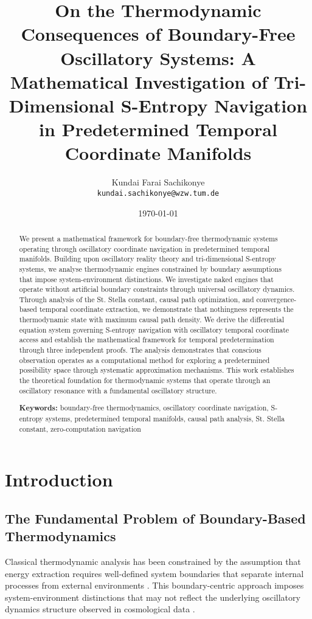 \documentclass[11pt,a4paper]{article}
\title{On the Thermodynamic Consequences of Boundary-Free Oscillatory Systems: A Mathematical Investigation of Tri-Dimensional S-Entropy Navigation in Predetermined Temporal Coordinate Manifolds}
\author{
Kundai Farai Sachikonye\\
\texttt{kundai.sachikonye@wzw.tum.de}
}
\date{\today}
\theoremstyle{remark}
\begin{document}
\maketitle

\begin{abstract}
We present a mathematical framework for boundary-free thermodynamic systems operating through oscillatory coordinate navigation in predetermined temporal manifolds. Building upon oscillatory reality theory and tri-dimensional S-entropy systems, we analyse thermodynamic engines constrained by boundary assumptions that impose system-environment distinctions. We investigate naked engines that operate without artificial boundary constraints through universal oscillatory dynamics. Through analysis of the St. Stella constant, causal path optimization, and convergence-based temporal coordinate extraction, we demonstrate that nothingness represents the thermodynamic state with maximum causal path density. We derive the differential equation system governing S-entropy navigation with oscillatory temporal coordinate access and establish the mathematical framework for temporal predetermination through three independent proofs. The analysis demonstrates that conscious observation operates as a computational method for exploring a predetermined possibility space through systematic approximation mechanisms. This work establishes the theoretical foundation for thermodynamic systems that operate through an oscillatory resonance with a fundamental oscillatory structure.

\textbf{Keywords:} boundary-free thermodynamics, oscillatory coordinate navigation, S-entropy systems, predetermined temporal manifolds, causal path analysis, St. Stella constant, zero-computation navigation
\end{abstract}

\tableofcontents

\section{Introduction}

\subsection{The Fundamental Problem of Boundary-Based Thermodynamics}

Classical thermodynamic analysis has been constrained by the assumption that energy extraction requires well-defined system boundaries that separate internal processes from external environments \cite{carnot1824reflections,clausius1867mechanical}. This boundary-centric approach imposes system-environment distinctions that may not reflect the underlying oscillatory dynamics structure observed in cosmological data \cite{weinberg2008cosmology,tegmark2014our}.
\end{document}
